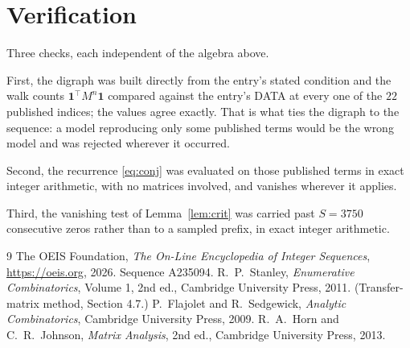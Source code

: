 \documentclass[11pt,a4paper]{article}
\theoremstyle{plain}
\theoremstyle{definition}
\begin{document}
\section{Verification}

Three checks, each independent of the algebra above.

First, the digraph was built directly from the entry's stated condition and the walk counts
$\mathbf{1}^{\!\top}M^{n}\mathbf{1}$ compared against the entry's DATA at every one of
the $22$ published indices; the values agree exactly. That is what ties the digraph to
the sequence: a model reproducing only some published terms would be the wrong model and
was rejected wherever it occurred.

Second, the recurrence \eqref{eq:conj} was evaluated on those published terms in exact
integer arithmetic, with no matrices involved, and vanishes wherever it applies.

Third, the vanishing test of Lemma~\ref{lem:crit} was carried past $S=3750$ consecutive
zeros rather than to a sampled prefix, in exact integer arithmetic.

\begin{thebibliography}{9}
 The OEIS Foundation, \emph{The On-Line Encyclopedia of Integer
Sequences}, \url{https://oeis.org}, 2026. Sequence A235094.
 R.~P.~Stanley, \emph{Enumerative Combinatorics}, Volume 1, 2nd ed.,
Cambridge University Press, 2011. (Transfer-matrix method, Section 4.7.)
 P.~Flajolet and R.~Sedgewick, \emph{Analytic Combinatorics}, Cambridge
University Press, 2009.
 R.~A.~Horn and C.~R.~Johnson, \emph{Matrix Analysis}, 2nd ed., Cambridge
University Press, 2013.
\end{thebibliography}
\end{document}
